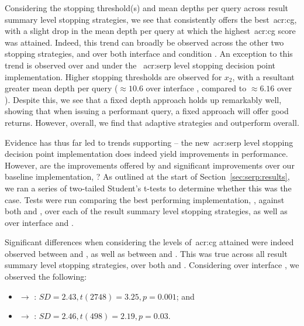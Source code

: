 Considering the stopping threshold(s) and mean depths per query across result summary level stopping strategies, we see that  consistently offers the best~\gls{acr:cg}, with a slight drop in the mean depth per query at which the highest~\gls{acr:cg} score was attained. Indeed, this trend can broadly be observed across the other two stopping strategies, and over both interface  and condition . An exception to this trend is observed over  and  under the ~\gls{acr:serp} level stopping decision point implementation. Higher stopping thresholds are observed for $x_2$, with a resultant greater mean depth per query ($\approx10.6$ over interface , compared to $\approx6.16$ over ). Despite this, we see that a fixed depth approach holds up remarkably well, showing that when issuing a performant query, a fixed approach will offer good returns. However, overall, we find that adaptive strategies  and  outperform  overall.

Evidence has thus far led to trends supporting  -- the new~\gls{acr:serp} level stopping decision point implementation does indeed yield improvements in performance. However, are the improvements offered by  and  significant improvements over our baseline implementation, ? As outlined at the start of Section~\ref{sec:serp:results}, we ran a series of two-tailed Student's t-tests to determine whether this was the case. Tests were run comparing the best performing implementation, , against both  and , over each of the result summary level stopping strategies, as well as over interface  and .

Significant differences when considering the levels of~\gls{acr:cg} attained were indeed observed between  and , as well as between  and . This was true across all result summary level stopping strategies, over both  and . Considering  over interface , we observed the following:

\begin{itemize}
    \item{ $\rightarrow$ : $SD=2.43, t(2748)=3.25, p=0.001$; and}
    \item{ $\rightarrow$ : $SD=2.46, t(498)=2.19, p=0.03$.}
\end{itemize}

